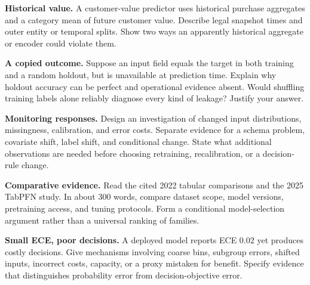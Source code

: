 \clearpage
\begin{challengeexercises}
\item \textbf{Historical value.} A customer-value predictor uses historical purchase aggregates and a category mean of future customer value. Describe legal snapshot times and outer entity or temporal splits. Show two ways an apparently historical aggregate or encoder could violate them.
\item \textbf{A copied outcome.} Suppose an input field equals the target in both training and a random holdout, but is unavailable at prediction time. Explain why holdout accuracy can be perfect and operational evidence absent. Would shuffling training labels alone reliably diagnose every kind of leakage? Justify your answer.
\item \textbf{Monitoring responses.} Design an investigation of changed input distributions, missingness, calibration, and error costs. Separate evidence for a schema problem, covariate shift, label shift, and conditional change. State what additional observations are needed before choosing retraining, recalibration, or a decision-rule change.
\item \textbf{Comparative evidence.} Read the cited 2022 tabular comparisons and the 2025 TabPFN study. In about 300 words, compare dataset scope, model versions, pretraining access, and tuning protocols. Form a conditional model-selection argument rather than a universal ranking of families.
\item \textbf{Small ECE, poor decisions.} A deployed model reports ECE $0.02$ yet produces costly decisions. Give mechanisms involving coarse bins, subgroup errors, shifted inputs, incorrect costs, capacity, or a proxy mistaken for benefit. Specify evidence that distinguishes probability error from decision-objective error.
\end{challengeexercises}

\clearpage
\begingroup\pagestyle{empty}\cleardoublepage\endgroup
\endgroup
